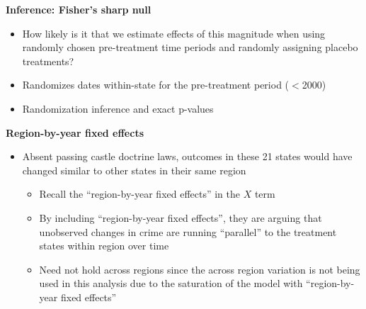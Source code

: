 \documentclass[notes=show]{beamer}
\begin{document}
\begin{frame}[plain]
\begin{center}
\textbf{Inference: Fisher's sharp null}
\end{center}

		\begin{itemize}
		\item How likely is it that we estimate effects of this magnitude when using randomly chosen pre-treatment time periods and randomly assigning placebo treatments?
		\item Randomizes dates within-state for the pre-treatment period ($<$2000)
		\item Randomization inference and exact p-values
		\end{itemize}

\end{frame}


\begin{frame}[plain]
	\begin{center}
	\textbf{Region-by-year fixed effects}
	\end{center}
	
	\begin{itemize}
	\item Absent passing castle doctrine laws, outcomes in these 21 states would have changed similar to other states in their same region
		\begin{itemize}
		\item Recall the ``region-by-year fixed effects'' in the $X$ term
		\item By including ``region-by-year fixed effects'', they are arguing that unobserved changes in crime are running ``parallel'' to the treatment states within region over time
		\item Need not hold across regions since the across region variation is not being used in this analysis due to the saturation of the model with ``region-by-year fixed effects''
		\end{itemize}
	\end{itemize}
\end{frame}
\end{document}
